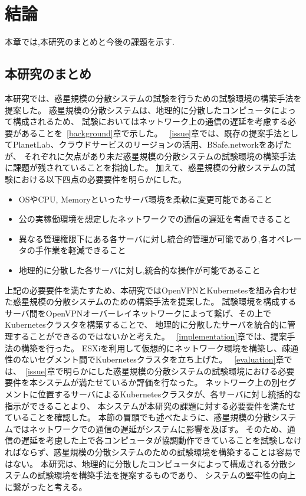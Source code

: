 \chapter{結論}
\label{conclusion}

本章では,本研究のまとめと今後の課題を示す.

\section{本研究のまとめ}
\label{conclusion:conclusion}

本研究では、惑星規模の分散システムの試験を行うための試験環境の構築手法を提案した。
惑星規模の分散システムは、地理的に分散したコンピュータによって構成されるため、
試験においてはネットワーク上の通信の遅延を考慮する必要があることを~\ref{background}章で示した。
~\ref{issue}章では、既存の提案手法としてPlanetLab、クラウドサービスのリージョンの活用、BSafe.networkをあげたが、
それぞれに欠点があり未だ惑星規模の分散システムの試験環境の構築手法に課題が残されていることを指摘した。
加えて、惑星規模の分散システムの試験における以下四点の必要要件を明らかにした。
\begin{itemize}
  \item OSやCPU, Memoryといったサーバ環境を柔軟に変更可能であること
  \item 公の実稼働環境を想定したネットワークでの通信の遅延を考慮できること
  \item 異なる管理権限下にある各サーバに対し統合的管理が可能であり,各オペレータの手作業を軽減できること
  \item 地理的に分散した各サーバに対し,統合的な操作が可能であること
\end{itemize}
上記の必要要件を満たすため、本研究ではOpenVPNとKubernetesを組み合わせた惑星規模の分散システムのための構築手法を提案した。
試験環境を構成するサーバ間をOpenVPNオーバーレイネットワークによって繋げ、その上でKubernetesクラスタを構築することで、
地理的に分散したサーバを統合的に管理することができるのではないかと考えた。
~\ref{implementation}章では、提案手法の構築を行った。
ESXiを利用して仮想的にネットワーク環境を構築し、疎通性のないセグメント間でKubernetesクラスタを立ち上げた。
~\ref{evaluation}章では、~\ref{issue}章で明らかにした惑星規模の分散システムの試験環境における必要要件を本システムが満たせているか評価を行なった。
ネットワーク上の別セグメントに位置するサーバによるKubernetesクラスタが、各サーバに対し統括的な指示ができることより、
本システムが本研究の課題に対する必要要件を満たせていることを確認した。
本節の冒頭でも述べたように、惑星規模の分散システムではネットワークでの通信の遅延がシステムに影響を及ぼす。
そのため、通信の遅延を考慮した上で各コンピュータが協調動作できていることを試験しなければならず、惑星規模の分散システムのための試験環境を構築することは容易ではない。
本研究は、地理的に分散したコンピュータによって構成される分散システムの試験環境を構築手法を提案するものであり、
システムの堅牢性の向上に繋がったと考える。

